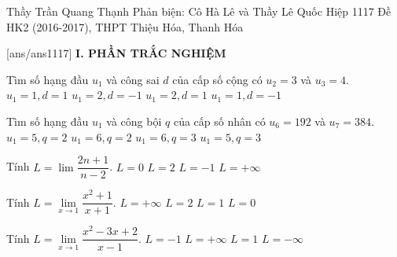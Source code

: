 \begin{name}
{Thầy Trần Quang Thạnh \newline Phản biện: Cô Hà Lê và Thầy Lê Quốc Hiệp}
{1117 Đề HK2 (2016-2017), THPT Thiệu Hóa, Thanh Hóa}%
	\end{name}
	\setcounter{ex}{0}\setcounter{bt}{0}
	[ans/ans1117]
\noindent\textbf{I. PHẦN TRẮC NGHIỆM}
\begin{ex}%
	Tìm số hạng đầu $u_1$ và công sai $d$ của cấp số cộng có $u_2=3$ và $u_3=4$.
	\choice
	{$u_1=1, d=1 $}
	{$u_1=2, d=-1 $}
	{\True $u_1=2, d=1 $}
	{$u_1=1, d=-1 $}
\end{ex}

\begin{ex}%
	Tìm số hạng đầu $u_1$ và công bội $q$ của cấp số nhân có $u_6=192$ và $u_7=384$.
	\choice
	{$u_1=5, q=2 $}
	{\True $u_1=6, q=2 $}
	{$u_1=6, q=3 $}
	{$u_1=5, q=3 $}
\end{ex}

\begin{ex}%
	Tính $L=\lim\limits\dfrac{2n+1}{n-2}$.
	\choice
	{$L=0 $}
	{\True $L=2 $}
	{$L=-1 $}
	{$L=+\infty $}
\end{ex}

\begin{ex}%
	Tính $L=\lim\limits_{x\to 1}\dfrac{x^2+1}{x+1}$.
	\choice
	{$L=+\infty $}
	{$L=2 $}
	{\True $L=1 $}
	{$L=0 $}
\end{ex}

\begin{ex}%
	Tính $L=\lim\limits_{x\to 1}\dfrac{x^2-3x+2}{x-1}$.
	\choice
	{\True $L=-1 $}
	{$L=+\infty $}
	{$L=1 $}
	{$L=-\infty $}
\end{ex}

